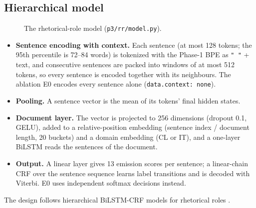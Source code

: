 \documentclass[11pt,a4paper]{article}
\newcommand{\code}[1]{\texttt{\small #1}}
\begin{document}
\subsection{Hierarchical model}
\begin{figure}[H]\centering
{}
\caption{The rhetorical-role model (\code{p3/rr/model.py}).}
\label{fig:model}\end{figure}

\begin{itemize}
  \item \textbf{Sentence encoding with context.} Each sentence (at most 128 tokens; the 95th percentile is
  72--84 words) is tokenized with the Phase-1 BPE as \texttt{" "} + text, and consecutive sentences are packed
  into windows of at most 512 tokens, so every sentence is encoded together with its neighbours.  The ablation
  E0 encodes every sentence alone (\code{data.context: none}).
  \item \textbf{Pooling.} A sentence vector is the mean of its tokens' final hidden states.
  \item \textbf{Document layer.} The vector is projected to 256 dimensions (dropout 0.1, GELU), added to a
  relative-position embedding (sentence index / document length, 20 buckets) and a domain embedding (CL or IT),
  and a one-layer BiLSTM \cite{hochreiter1997lstm} reads the sentences of the document.
  \item \textbf{Output.} A linear layer gives 13 emission scores per sentence; a linear-chain CRF
  \cite{lafferty2001crf} over the sentence sequence learns label transitions and is decoded with Viterbi.
  E0 uses independent softmax decisions instead.
\end{itemize}
The design follows hierarchical BiLSTM-CRF models for rhetorical roles \cite{bhattacharya2019rr,malik2022rr}.
\end{document}
